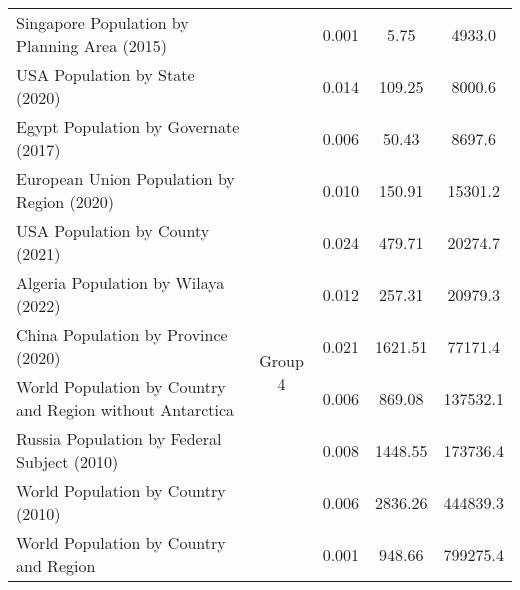 \begin{tabular}{lcccc}
Singapore Population by Planning Area (2015) &  & 0.001 & 5.75 & 4933.0 \\
USA Population by State (2020) &  & 0.014 & 109.25 & 8000.6 \\
Egypt Population by Governate (2017) &  & 0.006 & 50.43 & 8697.6 \\
\midrule
European Union Population by Region (2020) & \multirow{8}{*}{Group 4} & 0.010 & 150.91 & 15301.2 \\
USA Population by County (2021) &  & 0.024 & 479.71 & 20274.7 \\
Algeria Population by Wilaya (2022) &  & 0.012 & 257.31 & 20979.3 \\
China Population by Province (2020) &  & 0.021 & 1621.51 & 77171.4 \\
World Population by Country and Region without Antarctica &  & 0.006 & 869.08 & 137532.1 \\
Russia Population by Federal Subject (2010) &  & 0.008 & 1448.55 & 173736.4 \\
World Population by Country (2010) &  & 0.006 & 2836.26 & 444839.3 \\
World Population by Country and Region &  & 0.001 & 948.66 & 799275.4 \\
\midrule
\bottomrule
\end{tabular}